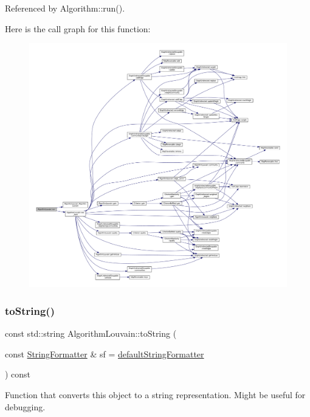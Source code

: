 Referenced by Algorithm\+::run().

Here is the call graph for this function\+:
\nopagebreak
\begin{figure}[H]
\begin{center}
\leavevmode
\includegraphics[width=350pt]{classAlgorithmLouvain_a0a72b9dda25c69d19996dc7448924c13_cgraph}
\end{center}
\end{figure}
\mbox{\label{classAlgorithmLouvain_a2df60c50eb63b783ba0e9e77226bebee}} 
\subsubsection{\texorpdfstring{to\+String()}{toString()}}
{\footnotesize\ttfamily const std\+::string Algorithm\+Louvain\+::to\+String (\begin{DoxyParamCaption}\item[{const \hyperlink{classStringFormatter}{String\+Formatter} \&}]{sf = {\ttfamily \hyperlink{stringFormatter_8h_abf1349c8e24162d0134072aff288f2a2}{default\+String\+Formatter}} }\end{DoxyParamCaption}) const\hspace{0.3cm}{\ttfamily [inline]}}

Function that converts this object to a string representation. Might be useful for debugging.


